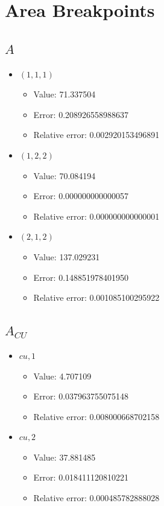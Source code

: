 \documentclass{article}%
\begin{document}
\section{Area Breakpoints}%
\thispagestyle{plain}%
\subsection{$A$}%
\begin{itemize}%
	\item $(1, 1, 1)$%
	\begin{itemize}%
		\item Value: 71.337504%
		\item Error: 0.208926558988637%
		\item Relative error: 0.002920153496891%
	\end{itemize}%
	\item $(1, 2, 2)$%
	\begin{itemize}%
		\item Value: 70.084194%
		\item Error: 0.000000000000057%
		\item Relative error: 0.000000000000001%
	\end{itemize}%
	\item $(2, 1, 2)$%
	\begin{itemize}%
		\item Value: 137.029231%
		\item Error: 0.148851978401950%
		\item Relative error: 0.001085100295922%
	\end{itemize}%
\end{itemize}%
\subsection{$A_{CU}$}%
\begin{itemize}%
	\item $\textit{cu},1$%
	\begin{itemize}%
		\item Value: 4.707109%
		\item Error: 0.037963755075148%
		\item Relative error: 0.008000668702158%
	\end{itemize}%
	\item $\textit{cu},2$%
	\begin{itemize}%
		\item Value: 37.881485%
		\item Error: 0.018411120810221%
		\item Relative error: 0.000485782888028%
	\end{itemize}%
\end{itemize}%
\end{document}
